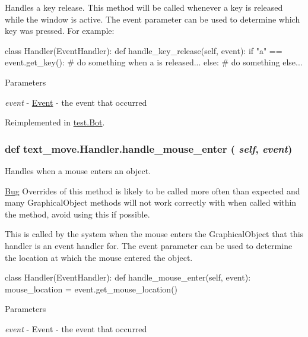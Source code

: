 Handles a key release. This method will be called whenever a key is released while the window is active. The event parameter can be used to determine which key was pressed. For example: 
\begin{DoxyCode}
 class Handler(EventHandler):
     def handle_key_release(self, event):
         if "a" == event.get_key():
             # do something when a is released...
         else:
             # do something else...
\end{DoxyCode}
 
\begin{DoxyParams}{Parameters}
\item[{\em event}]-\/ \hyperlink{classcs110graphics_1_1Event}{Event} -\/ the event that occurred \end{DoxyParams}


Reimplemented in \hyperlink{classtest_1_1Bot_a173d0fff530e0987193e9006b24f218b}{test.Bot}.\hypertarget{classtext__move_1_1Handler_a51652a1d51554e661117de1ee7856169}{
\subsubsection[{handle\_\-mouse\_\-enter}]{\setlength{\rightskip}{0pt plus 5cm}def text\_\-move.Handler.handle\_\-mouse\_\-enter ( {\em self}, \/   {\em event})}}
\label{classtext__move_1_1Handler_a51652a1d51554e661117de1ee7856169}


Handles when a mouse enters an object. \begin{Desc}
\item[\hyperlink{bug__bug000001}{Bug}]Overrides of this method is likely to be called more often than expected and many GraphicalObject methods will not work correctly with when called within the method, avoid using this if possible.\end{Desc}
This is called by the system when the mouse enters the GraphicalObject that this handler is an event handler for. The event parameter can be used to determine the location at which the mouse entered the object. 
\begin{DoxyCode}
 class Handler(EventHandler):
     def handle_mouse_enter(self, event):
         mouse_location = event.get_mouse_location()
\end{DoxyCode}
 
\begin{DoxyParams}{Parameters}
\item[{\em event}]-\/ Event -\/ the event that occurred \end{DoxyParams}


